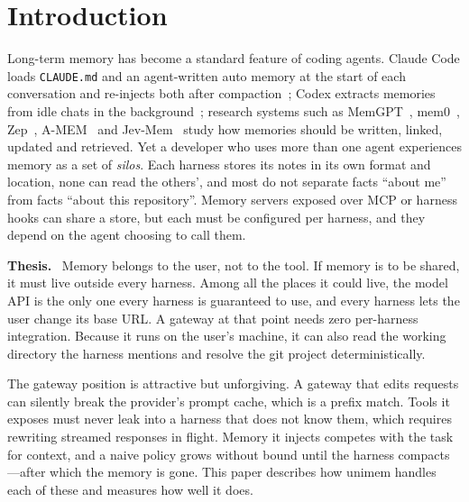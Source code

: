 \documentclass[10pt,twocolumn]{article}
\newcommand{\sys}{\textsf{unimem}}
\newcommand{\code}[1]{\texttt{\small #1}}
\newcommand{\para}[1]{\smallskip\noindent\textbf{#1}\ }
\begin{document}
\section{Introduction}
\label{sec:intro}

Long-term memory has become a standard feature of coding agents. Claude Code loads \code{CLAUDE.md} and an
agent-written auto memory at the start of each conversation and re-injects both after compaction~\cite{ccmemory,cccontext};
Codex extracts memories from idle chats in the background~\cite{codexmemories}; research systems such as
MemGPT~\cite{memgpt}, mem0~\cite{mem0}, Zep~\cite{zep}, A-MEM~\cite{amem} and Jev-Mem~\cite{jevmem2026} study how
memories should be written, linked, updated and retrieved. Yet a developer who uses more than one agent experiences
memory as a set of \emph{silos}. Each harness stores its notes in its own format and location, none can read the
others', and most do not separate facts ``about me'' from facts ``about this repository''. Memory servers exposed
over MCP or harness hooks can share a store, but each must be configured per harness, and they depend on the agent
choosing to call them.

\para{Thesis.} Memory belongs to the user, not to the tool. If memory is to be shared, it must live outside every
harness. Among all the places it could live, the model API is the only one every harness is guaranteed to use, and
every harness lets the user change its base URL. A gateway at that point needs zero per-harness integration. Because
it runs on the user's machine, it can also read the working directory the harness mentions and resolve the git
project deterministically.

The gateway position is attractive but unforgiving. A gateway that edits requests can silently break the provider's
prompt cache, which is a prefix match. Tools it exposes must never leak into a harness that does not know them,
which requires rewriting streamed responses in flight. Memory it injects competes with the task for context, and a
naive policy grows without bound until the harness compacts---after which the memory is gone. This paper describes
how \sys{} handles each of these and measures how well it does.
\end{document}
